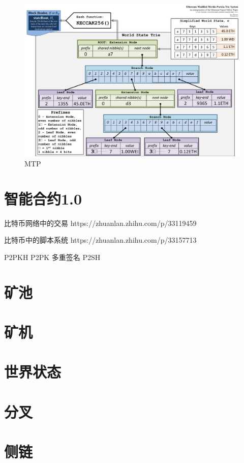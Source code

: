 \documentclass[UTF8]{ctexart}
\begin{document}
\begin{figure}
	\centering
	\includegraphics{rlp.png}
	\caption{MTP}
	\label{rlp}
\end{figure}

\section{智能合约1.0}

比特币网络中的交易 https://zhuanlan.zhihu.com/p/33119459

比特币中的脚本系统 https://zhuanlan.zhihu.com/p/33157713

P2PKH
P2PK
多重签名
P2SH

\section{矿池}

\section{矿机}

\section{世界状态}

\section{分叉}

\section{侧链}
\end{document}
